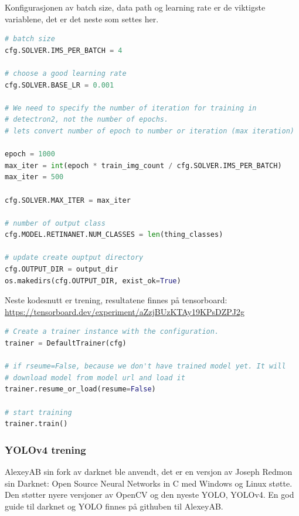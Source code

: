 Konfigurasjonen av batch size, data path og learning rate er de viktigste variablene, det er det neste som settes her. 

\begin{lstlisting}[language=Python, caption=Solver konfigurasjon i train.py]
# batch size
cfg.SOLVER.IMS_PER_BATCH = 4

# choose a good learning rate
cfg.SOLVER.BASE_LR = 0.001

# We need to specify the number of iteration for training in
# detectron2, not the number of epochs.
# lets convert number of epoch to number or iteration (max iteration)

epoch = 1000
max_iter = int(epoch * train_img_count / cfg.SOLVER.IMS_PER_BATCH)
max_iter = 500

cfg.SOLVER.MAX_ITER = max_iter

# number of output class
cfg.MODEL.RETINANET.NUM_CLASSES = len(thing_classes)

# update create ouptput directory
cfg.OUTPUT_DIR = output_dir
os.makedirs(cfg.OUTPUT_DIR, exist_ok=True)

\end{lstlisting}

Neste kodesnutt er trening, resultatene finnes på tensorboard: \\
\url{https://tensorboard.dev/experiment/aZzjBUzKTAy19KPsDZPJ2g}

\begin{lstlisting}[language=Python, caption=Treningskode i train.py]
# Create a trainer instance with the configuration.
trainer = DefaultTrainer(cfg) 

# if rseume=False, because we don't have trained model yet. It will
# download model from model url and load it
trainer.resume_or_load(resume=False)

# start training
trainer.train()

\end{lstlisting}


\subsubsection{YOLOv4 trening}

AlexeyAB sin fork av darknet ble anvendt, det er en versjon av Joseph Redmon sin Darknet: Open Source Neural Networks in C med Windows og Linux støtte. Den støtter nyere versjoner av OpenCV og den nyeste YOLO, YOLOv4. En god guide til darknet og YOLO finnes på githuben til AlexeyAB. \cite{AlexeyAB 2020}

